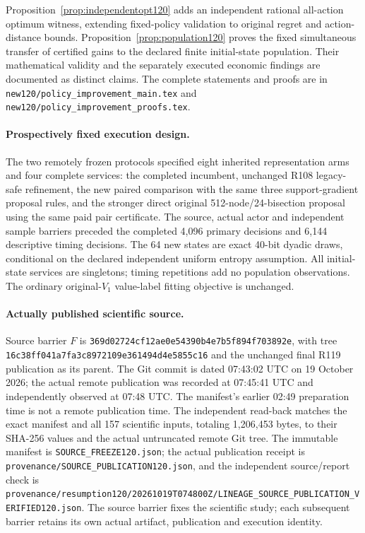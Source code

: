 Proposition~\ref{prop:independentopt120} adds an independent rational
all-action optimum witness, extending fixed-policy validation to original
regret and action-distance bounds. Proposition~\ref{prop:population120}
proves the fixed simultaneous transfer of certified gains to the declared
finite initial-state population. Their mathematical validity and the separately executed economic findings
are documented as distinct claims. The complete statements and proofs are in
\nolinkurl{new120/policy_improvement_main.tex} and
\nolinkurl{new120/policy_improvement_proofs.tex}.

\paragraph{Prospectively fixed execution design.}
The two remotely frozen protocols specified eight inherited representation
arms and four complete services: the completed incumbent, unchanged R108
legacy-safe refinement, the new paired comparison with the same three
support-gradient proposal rules, and the stronger direct original
512-node/24-bisection proposal using the same paid pair certificate.
The source, actual actor and independent sample barriers preceded the
completed 4,096 primary decisions and 6,144 descriptive timing decisions.
The 64 new states are exact 40-bit dyadic draws, conditional on the
declared independent uniform entropy assumption. All initial-state
services are singletons; timing repetitions add no population observations.
The ordinary original-$V_1$ value-label fitting objective is unchanged.

\paragraph{Actually published scientific source.}
Source barrier $F$ is \nolinkurl{369d02724cf12ae0e54390b4e7b5f894f703892e},
with tree \nolinkurl{16c38ff041a7fa3c8972109e361494d4e5855c16}
and the unchanged final R119 publication as its parent. The Git commit is
dated 07:43:02 UTC on 19 October 2026; the actual remote publication was
recorded at 07:45:41 UTC and independently observed at 07:48 UTC.
The manifest's earlier 02:49 preparation time is not a remote publication
time. The independent read-back matches the exact manifest and all 157
scientific inputs, totaling 1,206,453 bytes, to their SHA-256 values and
the actual untruncated remote Git tree. The immutable manifest is
\nolinkurl{SOURCE_FREEZE120.json}; the actual publication receipt is
\nolinkurl{provenance/SOURCE_PUBLICATION120.json}, and the independent
source/report check is
\nolinkurl{provenance/resumption120/20261019T074800Z/LINEAGE_SOURCE_PUBLICATION_VERIFIED120.json}.
The source barrier fixes the scientific study; each subsequent barrier
retains its own actual artifact, publication and execution identity.

